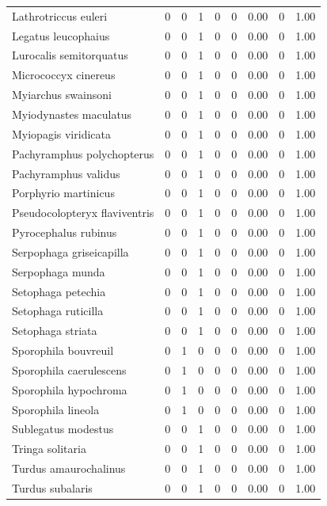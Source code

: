 \documentclass[
]{scrbook}
\begin{document}
\begin{table}
\begin{tabular}{lrrrrrrrr}
Lathrotriccus euleri & 0 & 0 & 1 & 0 & 0 & 0.00 & 0 & 1.00\\
Legatus leucophaius & 0 & 0 & 1 & 0 & 0 & 0.00 & 0 & 1.00\\
\addlinespace
Lurocalis semitorquatus & 0 & 0 & 1 & 0 & 0 & 0.00 & 0 & 1.00\\
Micrococcyx cinereus & 0 & 0 & 1 & 0 & 0 & 0.00 & 0 & 1.00\\
Myiarchus swainsoni & 0 & 0 & 1 & 0 & 0 & 0.00 & 0 & 1.00\\
Myiodynastes maculatus & 0 & 0 & 1 & 0 & 0 & 0.00 & 0 & 1.00\\
Myiopagis viridicata & 0 & 0 & 1 & 0 & 0 & 0.00 & 0 & 1.00\\
\addlinespace
Pachyramphus polychopterus & 0 & 0 & 1 & 0 & 0 & 0.00 & 0 & 1.00\\
Pachyramphus validus & 0 & 0 & 1 & 0 & 0 & 0.00 & 0 & 1.00\\
Porphyrio martinicus & 0 & 0 & 1 & 0 & 0 & 0.00 & 0 & 1.00\\
Pseudocolopteryx flaviventris & 0 & 0 & 1 & 0 & 0 & 0.00 & 0 & 1.00\\
Pyrocephalus rubinus & 0 & 0 & 1 & 0 & 0 & 0.00 & 0 & 1.00\\
\addlinespace
Serpophaga griseicapilla & 0 & 0 & 1 & 0 & 0 & 0.00 & 0 & 1.00\\
Serpophaga munda & 0 & 0 & 1 & 0 & 0 & 0.00 & 0 & 1.00\\
Setophaga petechia & 0 & 0 & 1 & 0 & 0 & 0.00 & 0 & 1.00\\
Setophaga ruticilla & 0 & 0 & 1 & 0 & 0 & 0.00 & 0 & 1.00\\
Setophaga striata & 0 & 0 & 1 & 0 & 0 & 0.00 & 0 & 1.00\\
\addlinespace
Sporophila bouvreuil & 0 & 1 & 0 & 0 & 0 & 0.00 & 0 & 1.00\\
Sporophila caerulescens & 0 & 1 & 0 & 0 & 0 & 0.00 & 0 & 1.00\\
Sporophila hypochroma & 0 & 1 & 0 & 0 & 0 & 0.00 & 0 & 1.00\\
Sporophila lineola & 0 & 1 & 0 & 0 & 0 & 0.00 & 0 & 1.00\\
Sublegatus modestus & 0 & 0 & 1 & 0 & 0 & 0.00 & 0 & 1.00\\
\addlinespace
Tringa solitaria & 0 & 0 & 1 & 0 & 0 & 0.00 & 0 & 1.00\\
Turdus amaurochalinus & 0 & 0 & 1 & 0 & 0 & 0.00 & 0 & 1.00\\
Turdus subalaris & 0 & 0 & 1 & 0 & 0 & 0.00 & 0 & 1.00\\

\end{tabular}
\end{table}
\end{document}
